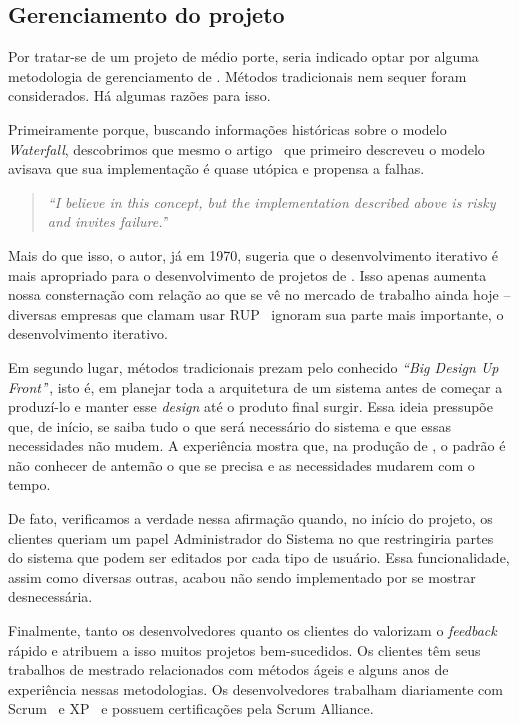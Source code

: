 \subsection{Gerenciamento do projeto}

Por tratar-se de um projeto de médio porte, seria indicado optar por alguma metodologia de gerenciamento de \software. Métodos tradicionais nem sequer foram considerados. Há algumas razões para isso.

Primeiramente porque, buscando informações históricas sobre o modelo \textit{Waterfall}, descobrimos que mesmo o artigo~\cite{waterfall} que primeiro descreveu o modelo avisava que sua implementação é quase utópica e propensa a falhas.

\begin{quote}
\textit{``I believe in this concept, but the implementation described above is risky and invites failure.'}'
\end{quote}

Mais do que isso, o autor, já em 1970, sugeria que o desenvolvimento iterativo é mais apropriado para o desenvolvimento de projetos de \software. Isso apenas aumenta nossa consternação com relação ao que se vê no mercado de trabalho ainda hoje -- diversas empresas que clamam usar RUP~\cite{rup} ignoram sua parte mais importante, o desenvolvimento iterativo.

Em segundo lugar, métodos tradicionais prezam pelo conhecido \textit{``Big Design Up Front'}', isto é, em planejar toda a arquitetura de um sistema antes de começar a produzí-lo e manter esse \textit{design} até o produto final surgir. Essa ideia pressupõe que, de início, se saiba tudo o que será necessário do sistema e que essas necessidades não mudem. A experiência mostra que, na produção de \software, o padrão é não conhecer de antemão o que se precisa e as necessidades mudarem com o tempo.

De fato, verificamos a verdade nessa afirmação quando, no início do projeto, os clientes queriam um papel Administrador do Sistema no \calopsita{} que restringiria partes do sistema que podem ser editados por cada tipo de usuário. Essa funcionalidade, assim como diversas outras, acabou não sendo implementado por se mostrar desnecessária.

Finalmente, tanto os desenvolvedores quanto os clientes do \calopsita{} valorizam o \textit{feedback} rápido e atribuem a isso muitos projetos bem-sucedidos. Os clientes têm seus trabalhos de mestrado relacionados com métodos ágeis e alguns anos de experiência nessas metodologias. Os desenvolvedores trabalham diariamente com Scrum~\cite{scrum} e XP~\cite{xp} e possuem certificações pela Scrum Alliance. 

